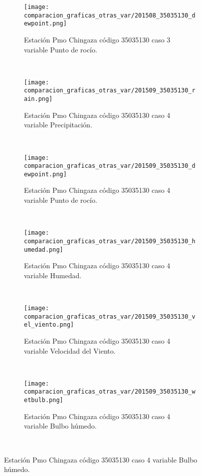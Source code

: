 \begin{figure}[H]
\centering
\begin{subfigure}[normla]{0.4\textwidth}
\caption{Estación Pmo Chingaza código 35035130 caso 3 variable Punto de rocío.}
\texttt{[image: comparacion\_graficas\_otras\_var/201508\_35035130\_dewpoint.png]}
\end{subfigure}
~
\begin{subfigure}[normla]{0.4\textwidth}
\caption{Estación Pmo Chingaza código 35035130 caso 4 variable Precipitación.}
\texttt{[image: comparacion\_graficas\_otras\_var/201509\_35035130\_rain.png]}
\end{subfigure}
~
\begin{subfigure}[normla]{0.4\textwidth}
\caption{Estación Pmo Chingaza código 35035130 caso 4 variable Punto de rocío.}
\texttt{[image: comparacion\_graficas\_otras\_var/201509\_35035130\_dewpoint.png]}
\end{subfigure}
~
\begin{subfigure}[normla]{0.4\textwidth}
\caption{Estación Pmo Chingaza código 35035130 caso 4 variable Humedad.}
\texttt{[image: comparacion\_graficas\_otras\_var/201509\_35035130\_humedad.png]}
\end{subfigure}
~
\begin{subfigure}[normla]{0.4\textwidth}
\caption{Estación Pmo Chingaza código 35035130 caso 4 variable Velocidad del Viento.}
\texttt{[image: comparacion\_graficas\_otras\_var/201509\_35035130\_vel\_viento.png]}
\end{subfigure}
~
\begin{subfigure}[normla]{0.4\textwidth}
\caption{Estación Pmo Chingaza código 35035130 caso 4 variable Bulbo húmedo.}
\texttt{[image: comparacion\_graficas\_otras\_var/201509\_35035130\_wetbulb.png]}
\end{subfigure}
~
\end{figure}
           

